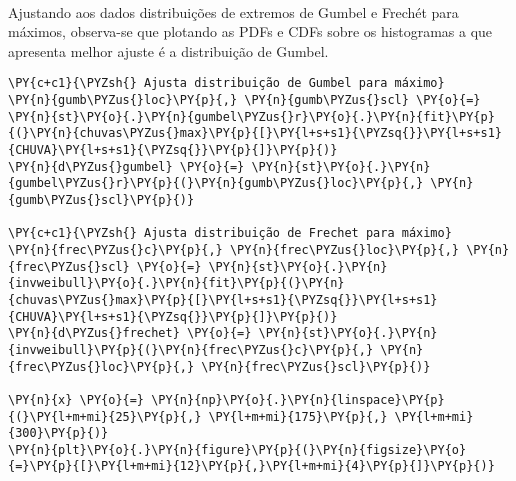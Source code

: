     \begin{center}
    \end{center}
    { \hspace*{\fill} \\}
    
    Ajustando aos dados distribuições de extremos de Gumbel e Frechét para
máximos, observa-se que plotando as PDFs e CDFs sobre os histogramas a
que apresenta melhor ajuste é a distribuição de Gumbel.

    \begin{tcolorbox}[breakable, size=fbox, boxrule=1pt, pad at break*=1mm,colback=cellbackground, colframe=cellborder]
\begin{Verbatim}[commandchars=\\\{\}]
\PY{c+c1}{\PYZsh{} Ajusta distribuição de Gumbel para máximo}
\PY{n}{gumb\PYZus{}loc}\PY{p}{,} \PY{n}{gumb\PYZus{}scl} \PY{o}{=} \PY{n}{st}\PY{o}{.}\PY{n}{gumbel\PYZus{}r}\PY{o}{.}\PY{n}{fit}\PY{p}{(}\PY{n}{chuvas\PYZus{}max}\PY{p}{[}\PY{l+s+s1}{\PYZsq{}}\PY{l+s+s1}{CHUVA}\PY{l+s+s1}{\PYZsq{}}\PY{p}{]}\PY{p}{)}
\PY{n}{d\PYZus{}gumbel} \PY{o}{=} \PY{n}{st}\PY{o}{.}\PY{n}{gumbel\PYZus{}r}\PY{p}{(}\PY{n}{gumb\PYZus{}loc}\PY{p}{,} \PY{n}{gumb\PYZus{}scl}\PY{p}{)}

\PY{c+c1}{\PYZsh{} Ajusta distribuição de Frechet para máximo}
\PY{n}{frec\PYZus{}c}\PY{p}{,} \PY{n}{frec\PYZus{}loc}\PY{p}{,} \PY{n}{frec\PYZus{}scl} \PY{o}{=} \PY{n}{st}\PY{o}{.}\PY{n}{invweibull}\PY{o}{.}\PY{n}{fit}\PY{p}{(}\PY{n}{chuvas\PYZus{}max}\PY{p}{[}\PY{l+s+s1}{\PYZsq{}}\PY{l+s+s1}{CHUVA}\PY{l+s+s1}{\PYZsq{}}\PY{p}{]}\PY{p}{)}
\PY{n}{d\PYZus{}frechet} \PY{o}{=} \PY{n}{st}\PY{o}{.}\PY{n}{invweibull}\PY{p}{(}\PY{n}{frec\PYZus{}c}\PY{p}{,} \PY{n}{frec\PYZus{}loc}\PY{p}{,} \PY{n}{frec\PYZus{}scl}\PY{p}{)}

\PY{n}{x} \PY{o}{=} \PY{n}{np}\PY{o}{.}\PY{n}{linspace}\PY{p}{(}\PY{l+m+mi}{25}\PY{p}{,} \PY{l+m+mi}{175}\PY{p}{,} \PY{l+m+mi}{300}\PY{p}{)}
\PY{n}{plt}\PY{o}{.}\PY{n}{figure}\PY{p}{(}\PY{n}{figsize}\PY{o}{=}\PY{p}{[}\PY{l+m+mi}{12}\PY{p}{,}\PY{l+m+mi}{4}\PY{p}{]}\PY{p}{)}


\end{Verbatim}
\end{tcolorbox}
